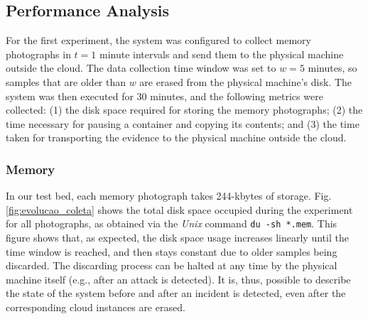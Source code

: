 \documentclass[10pt,journal,compsoc]{IEEEtran}
\newcommand{\marcos}[1]{{\color{green}{MARCOS: #1}}}
\newcommand{\fancyname}{Dizang}
\begin{document}
\subsection{Performance Analysis}
\label{sec:proposal-exp}

%
For the first experiment, the system was configured to collect memory photographs in $t=1$ minute intervals and send them to the physical machine outside the cloud.
%
The data collection time window was set to $w=5$ minutes, so samples that are older than $w$ are erased from the physical machine's disk.
%
The system was then executed for 30 minutes, and the following metrics were collected: 
(1) the disk space required for storing the memory photographs; 
(2) the time necessary for pausing a container and copying its contents; and 
(3) the time taken for transporting the evidence to the physical machine outside the cloud.
%
%

\subsubsection{Memory}

In our test bed, each memory photograph takes 244-kbytes of storage.
%
Fig. \ref{fig:evolucao_coleta} shows the total disk space occupied during the experiment for all photographs, as obtained via the \textit{Unix} command \texttt{du -sh *.mem}. 
%
This figure shows that, as expected, the disk space usage increases linearly until the time window is reached, and then stays constant due to older samples being discarded.
%
The discarding process can be halted at any time by the physical machine itself (e.g., after an attack is detected).
%
It is, thus, possible to describe the state of the system before and after an incident is detected, even after the corresponding cloud instances are erased.


%
%
\end{document}
